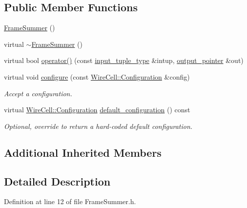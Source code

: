 \subsection*{Public Member Functions}
\begin{DoxyCompactItemize}
\item 
\hyperlink{class_wire_cell_1_1_gen_1_1_frame_summer_a7792991adbf4641dcf065db7f86df23a}{Frame\+Summer} ()
\item 
virtual \hyperlink{class_wire_cell_1_1_gen_1_1_frame_summer_a35a3f44b66184050db3080ea335acece}{$\sim$\+Frame\+Summer} ()
\item 
virtual bool \hyperlink{class_wire_cell_1_1_gen_1_1_frame_summer_a5ea8e6a5a87afdf6b9bff3012c93d2df}{operator()} (const \hyperlink{class_wire_cell_1_1_i_join_node_ae9ca74a75f29555ad20944d585f3b232}{input\+\_\+tuple\+\_\+type} \&intup, \hyperlink{class_wire_cell_1_1_i_join_node_a7af33cc87415e15f0e7db2b083f3def7}{output\+\_\+pointer} \&out)
\item 
virtual void \hyperlink{class_wire_cell_1_1_gen_1_1_frame_summer_ae815e1c33470a9d014ee42c8409dba79}{configure} (const \hyperlink{namespace_wire_cell_a9f705541fc1d46c608b3d32c182333ee}{Wire\+Cell\+::\+Configuration} \&config)
\begin{DoxyCompactList}\small\item\em Accept a configuration. \end{DoxyCompactList}\item 
virtual \hyperlink{namespace_wire_cell_a9f705541fc1d46c608b3d32c182333ee}{Wire\+Cell\+::\+Configuration} \hyperlink{class_wire_cell_1_1_gen_1_1_frame_summer_ac811b308e2f01644e04401aa3982f583}{default\+\_\+configuration} () const
\begin{DoxyCompactList}\small\item\em Optional, override to return a hard-\/coded default configuration. \end{DoxyCompactList}\end{DoxyCompactItemize}
\subsection*{Additional Inherited Members}


\subsection{Detailed Description}


Definition at line 12 of file Frame\+Summer.\+h.



